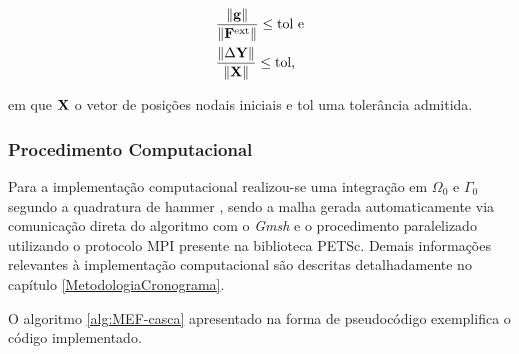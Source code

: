 \documentclass[_ArquivoPrincipal.tex]{subfiles}
\begin{document}
\begin{subequations}
    \begin{align}
         & \frac{\left\lVert{\mathbf{g}}\right\lVert}{\left\lVert{\mathbf{F}^\text{ext}}\right\lVert}\leq\text{tol e} \\
         & \frac{\left\lVert{\Delta\mathbf{Y}}\right\lVert}{\left\lVert{\mathbf{X}}\right\lVert}\leq\text{tol,}
    \end{align}
    \label{eq:CSD-erro}
\end{subequations}

\noindent em que $\mathbf{X}$ o vetor de posições nodais iniciais e tol uma tolerância admitida.

\subsubsection{Procedimento Computacional} \label{MEFP-Comp}

Para a implementação computacional realizou-se uma integração em $\Omega_0$ e $\Gamma_0$ segundo a quadratura de hammer \cite{hammer1956numerical}, sendo a malha gerada automaticamente via comunicação direta do algoritmo com o \textit{Gmsh} e o procedimento paralelizado utilizando o protocolo MPI presente na biblioteca PETSc. Demais informações relevantes à implementação computacional são descritas detalhadamente no capítulo \ref{MetodologiaCronograma}.

O algoritmo \ref{alg:MEF-casca} apresentado na forma de pseudocódigo exemplifica o código implementado.
\end{document}
